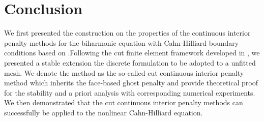 
\newpage
\section{Conclusion}%
\label{sec:conclusion}

We first presented the construction on the properties of the continuous interior penalty methods for the biharmonic equation with Cahn-Hilliard boundary conditions based on \cite{feng2007fully, brenner2012}.Following the cut finite element framework developed in
\cite{gurkan2019stabilized}, we presented a stable extension the discrete formulation to be adopted to a unfitted mesh. We denote the method as the so-called cut continuous interior penalty method which inherits the face-based ghost penalty and
provide theoretical proof for the stability and a priori analysis with corresponding numerical experiments. We then demonstrated that the cut continuous interior penalty methods can successfully be applied to the nonlinear Cahn-Hilliard
equation.

